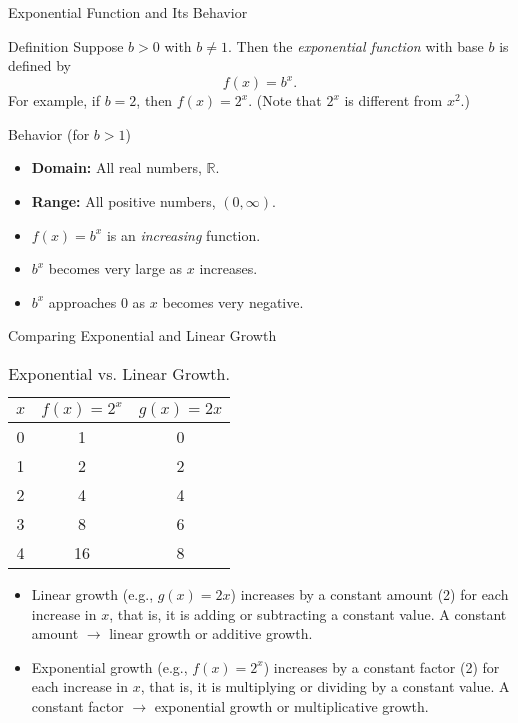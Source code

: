 \begin{frame}{Exponential Function and Its Behavior}
  \begin{block}{Definition}
    Suppose \(b>0\) with \(b\neq 1\). Then the \emph{exponential function} with base \(b\) is defined by
    \[
      f(x)=b^x.
    \]
    For example, if \(b=2\), then \(f(x)=2^x\). (Note that \(2^x\) is different from \(x^2\).)
  \end{block}
  \vspace{0.5em}
  \begin{block}{Behavior (for \(b>1\))}
    \begin{itemize}
      \item \textbf{Domain:} All real numbers, \(\mathbb{R}\).
      \item \textbf{Range:} All positive numbers, \((0,\infty)\).
      \item \(f(x)=b^x\) is an \emph{increasing} function.
      \item \(b^x\) becomes very large as \(x\) increases.
      \item \(b^x\) approaches \(0\) as \(x\) becomes very negative.
    \end{itemize}
  \end{block}
\end{frame}

\begin{frame}{Comparing Exponential and Linear Growth}
  \begin{table}[ht]
    \centering
    \begin{tabular}{c|c|c}
      \(x\) & \(f(x)=2^x\) & \(g(x)=2x\) \\ \hline
      0 & 1 & 0 \\
      1 & 2 & 2 \\
      2 & 4 & 4 \\
      3 & 8 & 6 \\
      4 & 16 & 8 \\
    \end{tabular}
    \caption{Exponential vs. Linear Growth.}
  \end{table}
  \begin{itemize}
    \item Linear growth (e.g., \(g(x)=2x\)) increases by a constant amount (2) for each increase in \(x\), that is, it is adding or subtracting a constant value. A constant amount \( \rightarrow \) linear growth or additive growth.
    \item Exponential growth (e.g., \(f(x)=2^x\)) increases by a constant factor (2) for each increase in \(x\), that is, it is multiplying or dividing by a constant value. A constant factor \( \rightarrow \) exponential growth or multiplicative growth.
  \end{itemize}
\end{frame}



